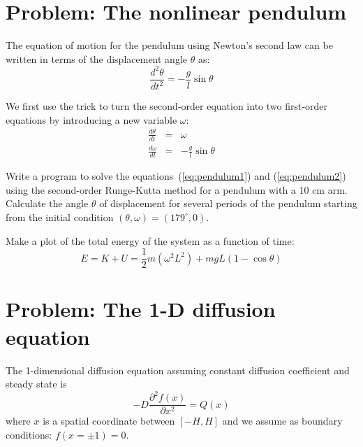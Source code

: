 \documentclass[10pt]{article}
\begin{document}
\section{Problem: The nonlinear pendulum}

The equation of motion for the pendulum using Newton's second law can be written in terms of the displacement angle $\theta$ as:
%
\begin{equation}\label{eq:pendulum}
\frac{d^2\theta}{dt^2} = - \frac{g}{l} \sin \theta
\end{equation}

We first use the trick to turn the second-order equation into two first-order equations by introducing a new variable $\omega$:
%
\begin{eqnarray}
\frac{d\theta}{dt} & = & \omega \label{eq:pendulum1}\\ 
\frac{d\omega}{dt} & = & -\frac{g}{l} \sin \theta \label{eq:pendulum2}
\end{eqnarray}

\begin{question}
Write a program to solve the equations~(\ref{eq:pendulum1}) and (\ref{eq:pendulum2}) using the second-order Runge-Kutta method for a pendulum with a 10 cm arm.
Calculate the angle $\theta$ of displacement for several periods of the pendulum starting from the initial condition $(\theta, \omega) = (179^\circ, 0)$.
\end{question}

\begin{question}
Make a plot of the total energy of the system as a function of time:
%
\begin{equation}
E = K + U = \frac{1}{2} m (\omega^2 L^2) + m g L (1 - \cos \theta) 
\end{equation}
\end{question}

\newpage

\section{Problem: The 1-D diffusion equation}

The 1-dimensional diffusion equation assuming constant diffusion coefficient and steady state is
%
\begin{equation}\label{eq:diffusion}
-D\frac{\partial^2 f(x)}{\partial x^2} = Q(x)
\end{equation}
%
where $x$ is a spatial coordinate between $[-H,H]$ and we assume as boundary conditions: $f(x = \pm 1) = 0$.
\end{document}
